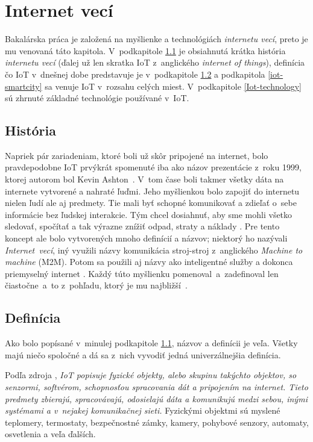 \chapter{Internet vecí}\label{Internet_veci}
Bakalárska práca je založená na myšlienke a technológiách \emph{internetu vecí}, preto je mu venovaná táto kapitola. 
V~podkapitole \ref{iot-history} je obsiahnutá krátka história \emph{internetu vecí} (ďalej už len skratka IoT z~anglického \emph{internet of things}), definícia čo IoT v~dnešnej dobe predstavuje je v~podkapitole \ref{iot-definition} a podkapitola \ref{iot-smartcity} sa venuje IoT v~rozsahu celých miest. 
V~podkapitole \ref{Iot-technology} sú zhrnuté základné technológie používané v~IoT.

\section{História}\label{iot-history}
Napriek pár zariadeniam, ktoré boli už skôr pripojené na internet, bolo pravdepodobne IoT prvýkrát spomenuté iba ako názov prezentácie z~roku 1999, ktorej autorom bol Kevin Ashton~\cite{ashton2009internet}. 
V~tom čase boli takmer všetky dáta na internete vytvorené a nahraté ľuďmi. 
Jeho myšlienkou bolo zapojiť do internetu nielen ľudí ale aj predmety. 
Tie mali byť schopné komunikovať a zdieľať  o~sebe informácie bez ľudskej interakcie. 
Tým chcel dosiahnuť, aby sme mohli všetko sledovať, spočítať a tak výrazne znížiť odpad, straty a náklady \cite{ashton2009internet,patel2016internet,IoT-History}. 
Pre tento koncept ale bolo vytvorených mnoho definícií a názvov; niektorý ho nazývali \emph{Internet~vecí}, iný využili názvy komunikácia stroj-stroj z~anglického \emph{Machine to machine} (M2M). 
Potom sa použili aj názvy ako inteligentné služby a dokonca priemyselný internet \cite{10.5555/2785661}.
Každý túto myšlienku pomenoval~a~zadefinoval len čiastočne~a~to z~pohľadu, ktorý je mu najbližší~\cite{kellmereit2013silent}.



\section{Definícia}\label{iot-definition}
Ako bolo popísané v~minulej podkapitole \ref{iot-history}, názvov a definícii je veľa. Všetky majú niečo spoločné a dá sa z~nich vyvodiť jedná univerzálnejšia definícia.

Podľa zdroja \cite{keramidas2016components}, \textit{IoT popisuje fyzické objekty, alebo skupinu takýchto objektov, so senzormi, softvérom, schopnosťou spracovania dát a pripojením na internet. 
Tieto predmety zbierajú, spracovávajú, odosielajú dáta a komunikujú medzi sebou, inými systémami a v~nejakej komunikačnej sieti.} 
Fyzickými objektmi sú myslené teplomery, termostaty, bezpečnostné zámky, kamery, pohybové senzory, automaty, osvetlenia a veľa ďalších. 

